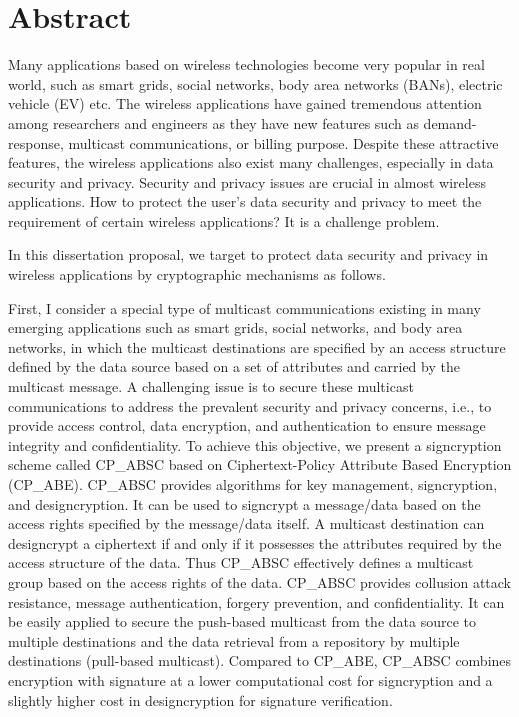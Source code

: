\documentclass[letterpaper,12pt]{article}
\begin{document}
   \newpage
      \section{Abstract}
    Many applications based on wireless technologies become very popular in real world, such as smart grids, social networks, body area networks (BANs), electric vehicle (EV) etc.  The wireless applications have gained tremendous attention among researchers and engineers as they have new features such as demand-response, multicast communications, or billing purpose. Despite these attractive features, the wireless applications also exist many challenges, especially in data security and privacy.  Security and privacy issues are crucial in almost wireless applications. How to protect the user's data security and privacy to meet the requirement of certain wireless applications? It is a challenge problem.

      In this dissertation proposal, we target to protect data security and privacy in wireless applications by cryptographic mechanisms as follows.

      First, I consider a special type of multicast communications existing in many emerging applications such as smart grids, social networks, and body area networks, in which the multicast destinations are specified by an access structure defined by the data source based on a set of attributes and carried by the multicast message. A challenging issue is to secure these multicast communications to address the prevalent security and privacy concerns, i.e., to provide access control, data encryption, and authentication to ensure message integrity and confidentiality. To achieve this objective, we present a signcryption scheme called CP\_ABSC based on Ciphertext-Policy Attribute Based Encryption (CP\_ABE). CP\_ABSC provides algorithms for key management, signcryption, and designcryption. It can be used to signcrypt a message/data based on the access rights specified by the message/data itself. A multicast destination can designcrypt a ciphertext if and only if it possesses the attributes required by the access structure of the data. Thus CP\_ABSC effectively defines a multicast group based on the access rights of the data.   CP\_ABSC provides collusion attack resistance, message authentication, forgery prevention, and confidentiality. It can be easily applied to secure the push-based multicast from the data source to multiple destinations and the data retrieval from a repository by multiple destinations (pull-based multicast). Compared to CP\_ABE, CP\_ABSC combines encryption with signature at a lower computational cost for signcryption and a slightly higher cost in designcryption for signature verification.
\end{document}
